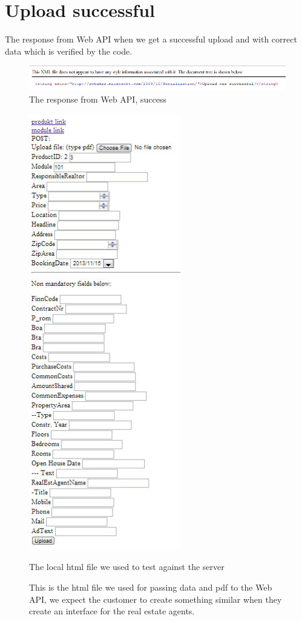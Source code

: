 \section{Upload successful}
The response from Web API when we get a successful upload and with correct data which is verified by the code.
\begin{figure}[H]
\includegraphics[width=17cm]{images/jsonproduct.png}
\caption{The response from Web API, success}
\end{figure}
\begin{center}
\begin{figure}
\includegraphics[height = 19cm]{images/localTest.jpg}
\caption{The local html file we used to test against the server}
\caption*{This is the html file we used for passing data and pdf to the Web API, we expect the customer to create something similar when they create an interface for the real estate agents.}
\end{figure}
\end{center}
